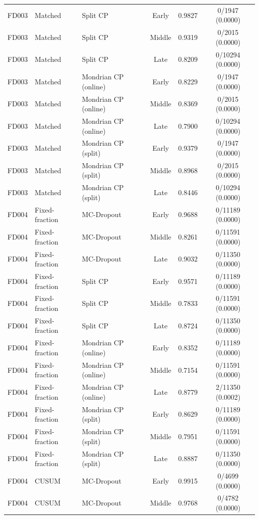 \begin{table}[t]
\begin{tabular}{lllccc}
FD003 & Matched & Split CP & Early & 0.9827 & 0/1947 (0.0000) \\
FD003 & Matched & Split CP & Middle & 0.9319 & 0/2015 (0.0000) \\
FD003 & Matched & Split CP & Late & 0.8209 & 0/10294 (0.0000) \\
FD003 & Matched & Mondrian CP (online) & Early & 0.8229 & 0/1947 (0.0000) \\
FD003 & Matched & Mondrian CP (online) & Middle & 0.8369 & 0/2015 (0.0000) \\
FD003 & Matched & Mondrian CP (online) & Late & 0.7900 & 0/10294 (0.0000) \\
FD003 & Matched & Mondrian CP (split) & Early & 0.9379 & 0/1947 (0.0000) \\
FD003 & Matched & Mondrian CP (split) & Middle & 0.8968 & 0/2015 (0.0000) \\
FD003 & Matched & Mondrian CP (split) & Late & 0.8446 & 0/10294 (0.0000) \\
FD004 & Fixed-fraction & MC-Dropout & Early & 0.9688 & 0/11189 (0.0000) \\
FD004 & Fixed-fraction & MC-Dropout & Middle & 0.8261 & 0/11591 (0.0000) \\
FD004 & Fixed-fraction & MC-Dropout & Late & 0.9032 & 0/11350 (0.0000) \\
FD004 & Fixed-fraction & Split CP & Early & 0.9571 & 0/11189 (0.0000) \\
FD004 & Fixed-fraction & Split CP & Middle & 0.7833 & 0/11591 (0.0000) \\
FD004 & Fixed-fraction & Split CP & Late & 0.8724 & 0/11350 (0.0000) \\
FD004 & Fixed-fraction & Mondrian CP (online) & Early & 0.8352 & 0/11189 (0.0000) \\
FD004 & Fixed-fraction & Mondrian CP (online) & Middle & 0.7154 & 0/11591 (0.0000) \\
FD004 & Fixed-fraction & Mondrian CP (online) & Late & 0.8779 & 2/11350 (0.0002) \\
FD004 & Fixed-fraction & Mondrian CP (split) & Early & 0.8629 & 0/11189 (0.0000) \\
FD004 & Fixed-fraction & Mondrian CP (split) & Middle & 0.7951 & 0/11591 (0.0000) \\
FD004 & Fixed-fraction & Mondrian CP (split) & Late & 0.8887 & 0/11350 (0.0000) \\
FD004 & CUSUM & MC-Dropout & Early & 0.9915 & 0/4699 (0.0000) \\
FD004 & CUSUM & MC-Dropout & Middle & 0.9768 & 0/4782 (0.0000) \\

\end{tabular}
\end{table}
